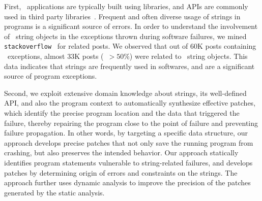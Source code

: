 First, \java\ applications are typically built using libraries, and
 APIs are commonly used in third party
libraries~\cite{Kawachiya:2008:ARM:1449764.1449795, gc, techreport}. Frequent
and
often diverse usage of strings in programs is a significant source of errors. In
order to understand the involvement of \java\ string objects in the exceptions
thrown during software failures, we mined
\texttt{stackoverflow}~\cite{stackoverflow} for related posts. We observed that
out of $60$K posts containing \java\ exceptions, almost $33$K posts (\ie\
$>50\%$) were related to \java\ string objects. This data indicates that strings
are frequently used in softwares, and are a significant source of program
exceptions.

Second, we exploit extensive domain knowledge about strings, its well-defined
API, and also the program context to automatically synthesize effective patches,
which identify the precise program location and the data that triggered the
failure, thereby repairing the program close to the point of failure and
preventing failure propagation. In other words, by targeting a specific data
structure, our approach develops precise patches that not only save the running
program from crashing, but also preserves the intended behavior. Our approach
statically identifies program statements vulnerable to string-related failures,
and develops patches by determining origin of errors and constraints on the
strings. The approach further uses dynamic analysis to improve the precision
of the patches generated by the static analysis. 

